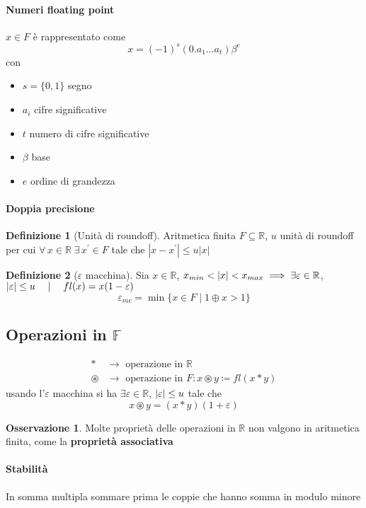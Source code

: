 \documentclass[a4paper,10pt]{article}
\theoremstyle{definition}
\newcommand{\re}{\mathbb{R}} %
\theoremstyle{indentdefinition}
\newtheorem{defn}{Definizione}[section]
\theoremstyle{indenttheorem}
\theoremstyle{myremark}
\newtheorem*{rem*}{Osservazione}
\theoremstyle{indentgeneral}
\theoremstyle{plain}
\theoremstyle{plain}
\begin{document}
\paragraph{Numeri floating point} $x\in F$ è rappresentato come 
$$x=(-1)^s(0.a_1\dots a_t)\beta
^e$$
con 
\begin{itemize}
    \item $s=\{0,1\}$ segno
    \item $a_i$   cifre significative 
    \item $t$ numero di cifre significative
    \item $\beta$ base
    \item $e$ ordine di grandezza
\end{itemize}
\paragraph{Doppia precisione}
 \begin{defn}[Unità di roundoff]
Aritmetica finita $F\subseteq\mathbb{R}$, $u$ unità di roundoff
per cui $\forall\,x\in\mathbb{R}\;\exists\,x^{\prime}\in F$ tale che $\left|x-x^{\prime}\right|\leq u\left|x\right|$
\end{defn}
\begin{defn}[$\varepsilon$ macchina]
Sia $x\in\re$, $x_{min}<\abs{x}<x_{max}\implies \exists\varepsilon\in\re$, $\abs{\varepsilon}\le u\quad\mid\quad fl(x)=x(1-\varepsilon)$
$$\varepsilon_{mc}=\min\{x\in F\mid 1\oplus x>1\}$$
\end{defn}


\subsection{Operazioni in $\mathbb{F}$}
\begin{align*}
    \ast&\rightarrow \text{ operazione in }\re \\
    \circledast&\rightarrow \text{ operazione in }F: \boxed{x\circledast y\coloneqq fl(x\ast y)}
\end{align*}
usando l'$\varepsilon$ macchina si ha $\exists\varepsilon\in\re$, $\abs{\varepsilon}\le u$ tale che   $$x\circledast y=(x\ast y)(1+\varepsilon)$$
\begin{rem*}
    Molte proprietà delle operazioni in $\re$ non valgono in aritmetica finita, come la \textbf{proprietà associativa}
\end{rem*}
\paragraph{Stabilità} In somma multipla sommare prima le coppie che hanno somma in modulo minore
\end{document}
